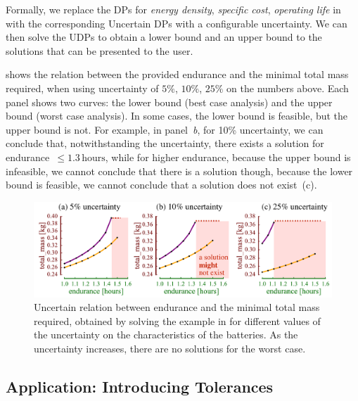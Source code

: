 \documentclass[twocolumn,english]{IEEEconf}
\theoremstyle{plain}
\theoremstyle{definition}
\theoremstyle{definition}
\theoremstyle{plain}
\newcommand{\colR}{\color[rgb]{0.555789,0.000000,0.000000}}
\newcommand{\colF}{\color[rgb]{0.094869,0.500000,0.000000}}
\newcommand{\R}[1]{{\colR #1}}
\newcommand{\F}[1]{{\colF #1}}
\begin{document}
Formally, we replace the DPs for\emph{ energy density}, \emph{specific
cost}, \emph{operating life} in~ with the
corresponding Uncertain DPs with a configurable uncertainty. We can
then solve the UDPs to obtain a lower bound and an upper bound to
the solutions that can be presented to the user.

 shows the relation between
the provided \F{endurance} and the minimal \R{total mass} required,
when using uncertainty of $5\%$, $10\%$, $25\%$ on the numbers
above. Each panel shows two curves: the lower bound (best case analysis)
and the upper bound (worst case analysis). In some cases, the lower
bound is feasible, but the upper bound is not. For example, in panel~\emph{b},
for 10\% uncertainty, we can conclude that, notwithstanding the uncertainty,
there exists a solution for endurance~$\leq1.3\,\text{hours}$, while
for higher endurance, because the upper bound is infeasible, we cannot
conclude that there is a solution \textemdash{} though, because the
lower bound is feasible, we cannot conclude that a solution does not
exist~(c). 
\begin{center}
\begin{figure}[H]
\begin{centering}
\includegraphics[scale=0.33]{unc_battery_uncertain}
\par\end{centering}
\caption{\label{fig:unc_battery_uncertain}Uncertain relation between \F{endurance}
and the minimal \R{total mass} required, obtained by solving the
example in  for different values of the uncertainty
on the characteristics of the batteries. As the uncertainty increases,
there are no solutions for the worst case.}
\end{figure}
\par\end{center}

\subsection{Application: Introducing Tolerances\label{sec:Application-tolerance}}
\end{document}
